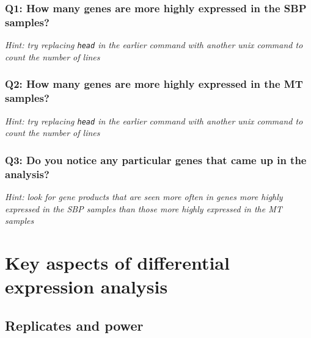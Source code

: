 \documentclass[11pt]{article}
\begin{document}
    \hypertarget{q1-how-many-genes-are-more-highly-expressed-in-the-sbp-samples}{%
\subsubsection{Q1: How many genes are more highly expressed in the SBP
samples?}\label{q1-how-many-genes-are-more-highly-expressed-in-the-sbp-samples}}

\textit{Hint: try replacing \texttt{head} in the earlier command with
another unix command to count the number of lines}

\hypertarget{q2-how-many-genes-are-more-highly-expressed-in-the-mt-samples}{%
\subsubsection{Q2: How many genes are more highly expressed in the MT
samples?}\label{q2-how-many-genes-are-more-highly-expressed-in-the-mt-samples}}

\textit{Hint: try replacing \texttt{head} in the earlier command with
another unix command to count the number of lines}

\hypertarget{q3-do-you-notice-any-particular-genes-that-came-up-in-the-analysis}{%
\subsubsection{Q3: Do you notice any particular genes that came up in
the
analysis?}\label{q3-do-you-notice-any-particular-genes-that-came-up-in-the-analysis}}

\textit{Hint: look for gene products that are seen more often in genes
more highly expressed in the SBP samples than those more highly
expressed in the MT samples}




\newpage





    \hypertarget{key-aspects-of-differential-expression-analysis}{%
\section{Key aspects of differential expression
analysis}\label{key-aspects-of-differential-expression-analysis}}

    \hypertarget{replicates-and-power}{%
\subsection{Replicates and power}\label{replicates-and-power}}
\end{document}
